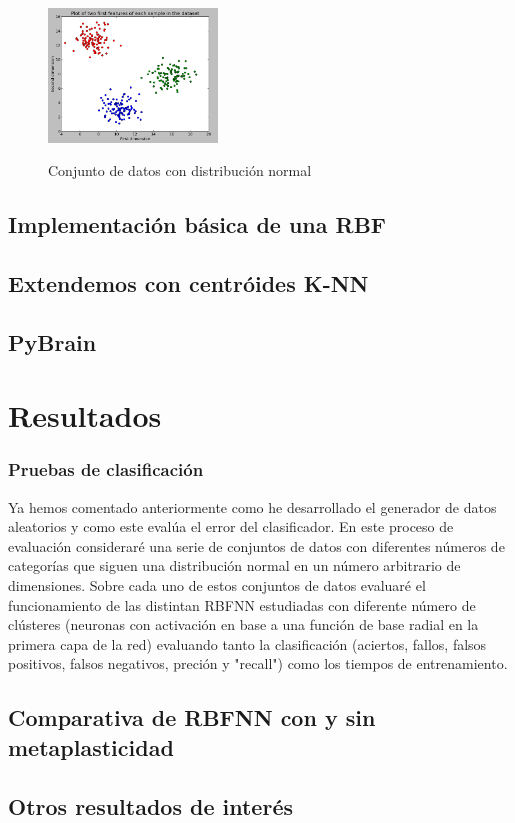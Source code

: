 \documentclass[10pt,a4paper, twocolumn]{report}
\begin{document}
\begin{figure}[!h]{}
    \centering
    \includegraphics[width=0.4\textwidth]{img/clusteredData1.png}
    \label{fig:clusteredData1}
    \caption{Conjunto de datos con distribución normal}
\end{figure}
\section{Implementación básica de una RBF}

\section{Extendemos con centróides K-NN}

\section{PyBrain}


\chapter{Resultados}
\subsection{Pruebas de clasificación}
Ya hemos comentado anteriormente como he desarrollado el generador de datos aleatorios y como este evalúa el error del clasificador. En este proceso de evaluación consideraré una serie de conjuntos de datos con diferentes números de categorías que siguen una distribución normal en un número arbitrario de dimensiones. Sobre cada uno de estos conjuntos de datos evaluaré el funcionamiento de las distintan RBFNN estudiadas con diferente número de clústeres (neuronas con activación en base a una función de base radial en la primera capa de la red) evaluando tanto la clasificación (aciertos, fallos, falsos positivos, falsos negativos, preción y "recall") como los tiempos de entrenamiento.

\section{Comparativa de RBFNN con y sin metaplasticidad}
\section{Otros resultados de interés}
\end{document}
